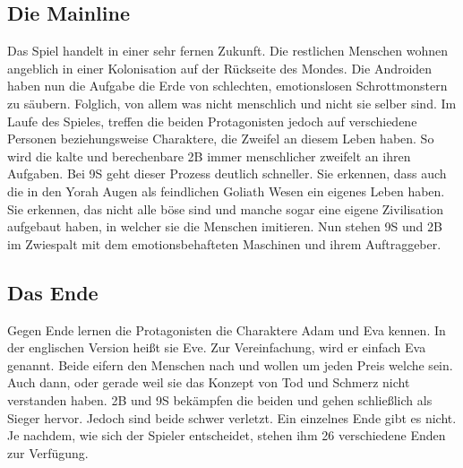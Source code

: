 \subsection{Die Mainline}
Das Spiel handelt in einer sehr fernen Zukunft. Die restlichen Menschen wohnen angeblich in einer Kolonisation auf der Rückseite des Mondes. Die Androiden haben nun die Aufgabe die Erde von \dq schlechten, emotionslosen Schrottmonstern \dq zu säubern. Folglich, von allem was nicht menschlich und nicht sie selber sind. Im Laufe des Spieles, treffen die beiden Protagonisten jedoch auf verschiedene Personen beziehungsweise Charaktere, die Zweifel an diesem Leben haben. So wird die kalte und berechenbare 2B immer menschlicher zweifelt an ihren Aufgaben. Bei 9S geht dieser Prozess deutlich schneller. Sie erkennen, dass auch die in den Yorah Augen als feindlichen Goliath Wesen ein eigenes Leben haben. Sie erkennen, das nicht alle böse sind und manche sogar eine eigene Zivilisation aufgebaut haben, in welcher sie die Menschen imitieren. Nun stehen 9S und 2B im Zwiespalt mit dem emotionsbehafteten Maschinen und ihrem Auftraggeber. 

\subsection{Das Ende}
Gegen Ende lernen die Protagonisten die Charaktere Adam und Eva kennen. In der englischen Version heißt sie Eve. Zur Vereinfachung, wird er einfach Eva genannt. Beide eifern den Menschen nach und wollen um jeden Preis welche sein. Auch dann, oder gerade weil sie das Konzept von Tod und Schmerz nicht verstanden haben. 2B und 9S bekämpfen die beiden und gehen schließlich als Sieger hervor. Jedoch sind beide schwer verletzt. Ein einzelnes Ende gibt es nicht. Je nachdem, wie sich der Spieler entscheidet, stehen ihm 26 verschiedene Enden zur Verfügung. 